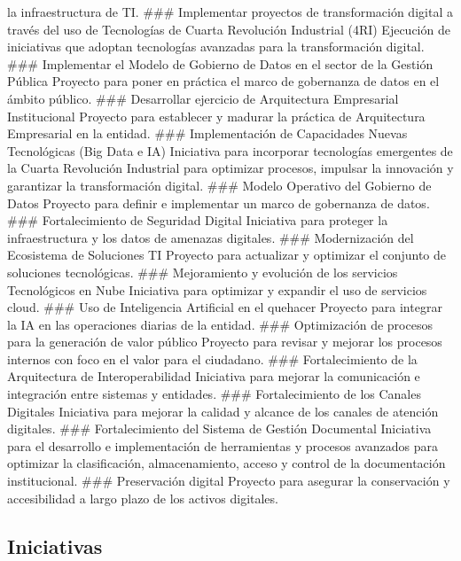 \documentclass[
	a4paper, %
	12pt, %
]{include/CSSullivanBusinessReport}
\begin{document}
la infraestructura de TI. \#\#\# Implementar proyectos de transformación
digital a través del uso de Tecnologías de Cuarta Revolución Industrial
(4RI) Ejecución de iniciativas que adoptan tecnologías avanzadas para la
transformación digital. \#\#\# Implementar el Modelo de Gobierno de
Datos en el sector de la Gestión Pública Proyecto para poner en práctica
el marco de gobernanza de datos en el ámbito público. \#\#\# Desarrollar
ejercicio de Arquitectura Empresarial Institucional Proyecto para
establecer y madurar la práctica de Arquitectura Empresarial en la
entidad. \#\#\# Implementación de Capacidades Nuevas Tecnológicas (Big
Data e IA) Iniciativa para incorporar tecnologías emergentes de la
Cuarta Revolución Industrial para optimizar procesos, impulsar la
innovación y garantizar la transformación digital. \#\#\# Modelo
Operativo del Gobierno de Datos Proyecto para definir e implementar un
marco de gobernanza de datos. \#\#\# Fortalecimiento de Seguridad
Digital Iniciativa para proteger la infraestructura y los datos de
amenazas digitales. \#\#\# Modernización del Ecosistema de Soluciones TI
Proyecto para actualizar y optimizar el conjunto de soluciones
tecnológicas. \#\#\# Mejoramiento y evolución de los servicios
Tecnológicos en Nube Iniciativa para optimizar y expandir el uso de
servicios cloud. \#\#\# Uso de Inteligencia Artificial en el quehacer
Proyecto para integrar la IA en las operaciones diarias de la entidad.
\#\#\# Optimización de procesos para la generación de valor público
Proyecto para revisar y mejorar los procesos internos con foco en el
valor para el ciudadano. \#\#\# Fortalecimiento de la Arquitectura de
Interoperabilidad Iniciativa para mejorar la comunicación e integración
entre sistemas y entidades. \#\#\# Fortalecimiento de los Canales
Digitales Iniciativa para mejorar la calidad y alcance de los canales de
atención digitales. \#\#\# Fortalecimiento del Sistema de Gestión
Documental Iniciativa para el desarrollo e implementación de
herramientas y procesos avanzados para optimizar la clasificación,
almacenamiento, acceso y control de la documentación institucional.
\#\#\# Preservación digital Proyecto para asegurar la conservación y
accesibilidad a largo plazo de los activos digitales.

\subsection{Iniciativas}\label{sec:iniciativas}

\begin{quote}
\end{quote}
\end{document}
